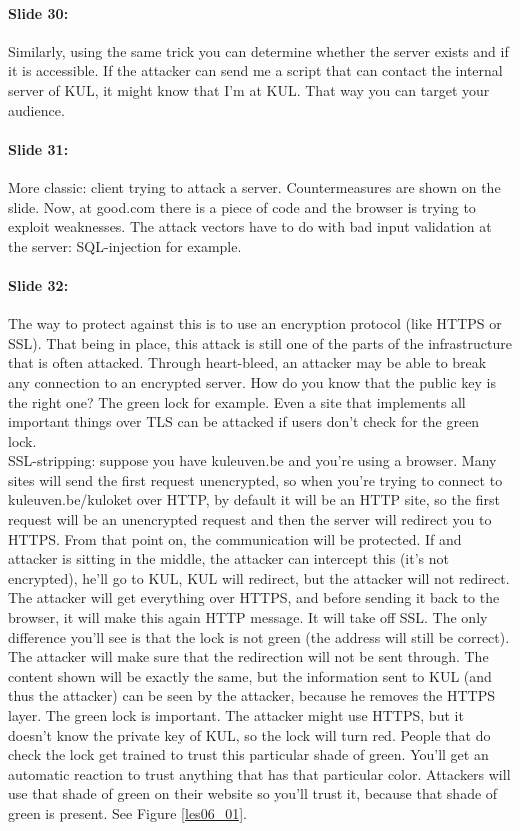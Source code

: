 \documentclass[10pt,a4paper]{report}
\begin{document}
\paragraph{Slide 30:} Similarly, using the same trick you can determine whether the server exists and if it is accessible. If the attacker can send me a script that can contact the internal server of KUL, it might know that I'm at KUL. That way you can target your audience.

\paragraph{Slide 31:} More classic: client trying to attack a server. Countermeasures are shown on the slide. Now, at good.com there is a piece of code and the browser is trying to exploit weaknesses. The attack vectors have to do with bad input validation at the server: SQL-injection for example.

\paragraph{Slide 32:} The way to protect against this is to use an encryption protocol (like HTTPS or SSL). That being in place, this attack is still one of the parts of the infrastructure that is often attacked. Through heart-bleed, an attacker may be able to break any connection to an encrypted server. How do you know that the public key is the right one? The green lock for example. Even a site that implements all important things over TLS can be attacked if users don't check for the green lock.\\
SSL-stripping: suppose you have kuleuven.be and you're using a browser. Many sites will send the first request unencrypted, so when you're trying to connect to kuleuven.be/kuloket over HTTP, by default it will be an HTTP site, so the first request will be an unencrypted request and then the server will redirect you to HTTPS. From that point on, the communication will be protected. If and attacker is sitting in the middle, the attacker can intercept this (it's not encrypted), he'll go to KUL, KUL will redirect, but the attacker will not redirect. The attacker will get everything over HTTPS, and before sending it back to the browser, it will make this again HTTP message. It will take off SSL. The only difference you'll see is that the lock is not green (the address will still be correct). The attacker will make sure that the redirection will not be sent through. The content shown will be exactly the same, but the information sent to KUL (and thus the attacker) can be seen by the attacker, because he removes the HTTPS layer. The green lock is important. The attacker might use HTTPS, but it doesn't know the private key of KUL, so the lock will turn red.
People that do check the lock get trained to trust this particular shade of green. You'll get an automatic reaction to trust anything that has that particular color. Attackers will use that shade of green on their website so you'll trust it, because that shade of green is present. See Figure \ref{les06_01}.
\end{document}
